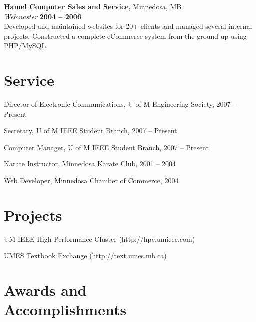 \documentclass[margin,line,letterpaper]{resume}
\begin{document}
\begin{resume}
  {\bf Hamel Computer Sales and Service}, Minnedosa, MB \vspace{2mm}\\\vspace{1mm}%
  {\sl Webmaster} \hfill {\bf 2004 -- 2006}\\
  Developed and maintained websites for 20+ clients and managed several internal projects.
  Constructed a complete eCommerce system from the ground up using PHP/MySQL.

  \newpage
  \section{\mysidestyle Service}

  \begin{list2}
    \item Director of Electronic Communications, U of M Engineering Society, 2007 -- Present
    \item Secretary, U of M IEEE Student Branch, 2007 -- Present
    \item Computer Manager, U of M IEEE Student Branch, 2007 -- Present
    \item Karate Instructor, Minnedosa Karate Club, 2001 -- 2004
    \item Web Developer, Minnedosa Chamber of Commerce, 2004
  \end{list2}

  \section{\mysidestyle Projects}

  \begin{list2}
    \item UM IEEE High Performance Cluster (http://hpc.umieee.com)
    \item UMES Textbook Exchange (http://text.umes.mb.ca)
  \end{list2}


  \section{\mysidestyle Awards and\\Accomplishments}


\end{resume}
\end{document}
